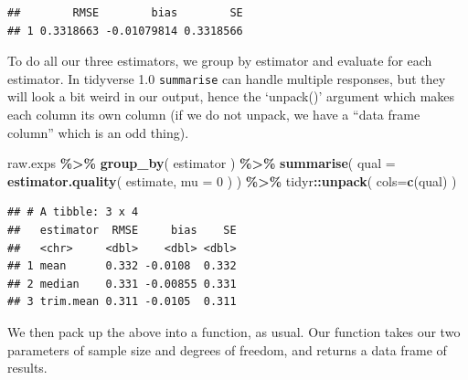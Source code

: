 \documentclass[
]{book}
\newenvironment{Shaded}{\begin{snugshade}}{\end{snugshade}}
\newcommand{\AttributeTok}[1]{\textcolor[rgb]{0.13,0.29,0.53}{#1}}
\newcommand{\DecValTok}[1]{\textcolor[rgb]{0.00,0.00,0.81}{#1}}
\newcommand{\FunctionTok}[1]{\textcolor[rgb]{0.13,0.29,0.53}{\textbf{#1}}}
\newcommand{\NormalTok}[1]{#1}
\newcommand{\SpecialCharTok}[1]{\textcolor[rgb]{0.81,0.36,0.00}{\textbf{#1}}}
\begin{document}
\begin{verbatim}
##        RMSE        bias        SE
## 1 0.3318663 -0.01079814 0.3318566
\end{verbatim}

To do all our three estimators, we group by estimator and evaluate for each
estimator. In tidyverse 1.0 \texttt{summarise} can handle multiple responses, but they
will look a bit weird in our output, hence the `unpack()' argument which
makes each column its own column (if we do not unpack, we have a ``data frame
column'' which is an odd thing).

\begin{Shaded}
\begin{Highlighting}[]
\NormalTok{raw.exps }\SpecialCharTok{\%\textgreater{}\%}
    \FunctionTok{group\_by}\NormalTok{( estimator ) }\SpecialCharTok{\%\textgreater{}\%}
    \FunctionTok{summarise}\NormalTok{( }\AttributeTok{qual =} \FunctionTok{estimator.quality}\NormalTok{( estimate, }\AttributeTok{mu =} \DecValTok{0}\NormalTok{ ) ) }\SpecialCharTok{\%\textgreater{}\%}
\NormalTok{    tidyr}\SpecialCharTok{::}\FunctionTok{unpack}\NormalTok{( }\AttributeTok{cols=}\FunctionTok{c}\NormalTok{(qual) )}
\end{Highlighting}
\end{Shaded}

\begin{verbatim}
## # A tibble: 3 x 4
##   estimator  RMSE     bias    SE
##   <chr>     <dbl>    <dbl> <dbl>
## 1 mean      0.332 -0.0108  0.332
## 2 median    0.331 -0.00855 0.331
## 3 trim.mean 0.311 -0.0105  0.311
\end{verbatim}

We then pack up the above into a function, as usual.
Our function takes our two parameters of sample size and degrees of freedom, and returns a data frame of results.
\end{document}
